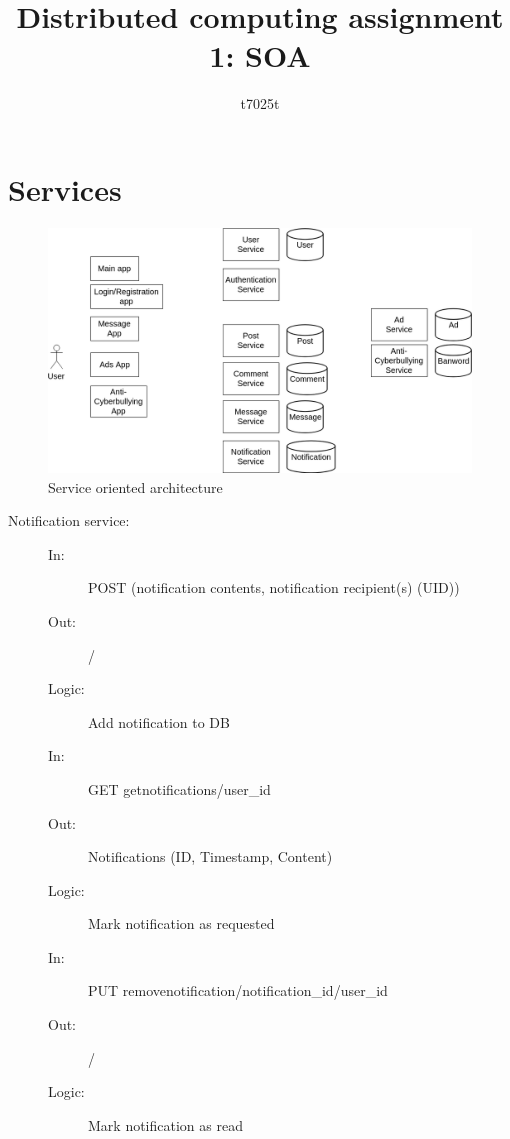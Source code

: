\documentclass{article}
\title{Distributed computing assignment 1: SOA}
\author{t7025t }
\date{}
\begin{document}
\maketitle

\section{Services}

\begin{figure}[H]
    \centering
    \includegraphics[width=\textwidth]{DC.png}
    \caption{Service oriented architecture}
    \label{soa}
\end{figure}

\begin{description}
    \item [Notification service:] 
    \begin{description}
        \item[]
        \item[In:] POST (notification contents, notification recipient(s) (UID))
        \item[Out:] /
        \item[Logic:] Add notification to DB
        \item[]
        
        \item[In:] GET getnotifications/user\_id 
        \item[Out:] Notifications (ID, Timestamp, Content)
        \item[Logic:] Mark notification as requested
        \item[]
        
        \item[In:] PUT removenotification/notification\_id/user\_id
        \item[Out:] /
        \item[Logic: ] Mark notification as read
    \end{description}
\end{description}
\end{document}
